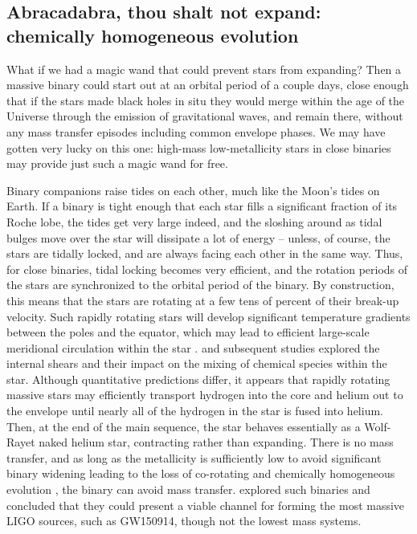 \documentclass[iop,onecolumn]{revtex4}
\begin{document}
\subsection{Abracadabra, thou shalt not expand: chemically homogeneous evolution}

What if we had a magic wand that could prevent stars from expanding?  Then a massive binary could start out at an orbital period of a couple days, close enough that if the stars made black holes in situ they would merge within the age of the Universe through the emission of gravitational waves, and remain there, without any mass transfer episodes including common envelope phases.  We may have gotten very lucky on this one: high-mass low-metallicity stars in close binaries may provide just such a magic wand for free.

Binary companions raise tides on each other, much like the Moon's tides on Earth.  If a binary is tight enough that each star fills a significant fraction of its Roche lobe, the tides get very large indeed, and the sloshing around as tidal bulges move over the star will dissipate a lot of energy -- unless, of course, the stars are tidally locked, and are always facing each other in the same way.  Thus, for close binaries, tidal locking becomes very efficient, and the rotation periods of the stars are synchronized to the orbital period of the binary.  By construction, this means that the stars are rotating at a few tens of percent of their break-up velocity.  Such rapidly rotating stars will develop significant temperature gradients between the poles and the equator, which may lead to efficient large-scale meridional circulation within the star \citep{Eddington:1925,Sweet:1950}.  \citet{EndalSofia:1978} and subsequent studies \citep[e.g.,][]{Heger:2000,MaederMeynet:2000,Yoon:2006} explored the internal shears and their impact on the mixing of chemical species within the star.  Although quantitative predictions differ, it appears that rapidly rotating massive stars may efficiently transport hydrogen into the core and helium out to the envelope until nearly all of the hydrogen in the star is fused into helium.  Then, at the end of the main sequence, the star behaves essentially as a Wolf-Rayet naked helium star, contracting rather than expanding.  There is no mass transfer, and as long as the metallicity is sufficiently low to avoid significant binary widening leading to the loss of co-rotating and chemically homogeneous evolution \citep{deMink:2009}, the binary can avoid mass transfer.  \citet{MandeldeMink:2016,deMinkMandel:2016,Marchant:2016} explored such binaries and concluded that they could present a viable channel for forming the most massive LIGO sources, such as GW150914, though not the lowest mass systems.
\end{document}
